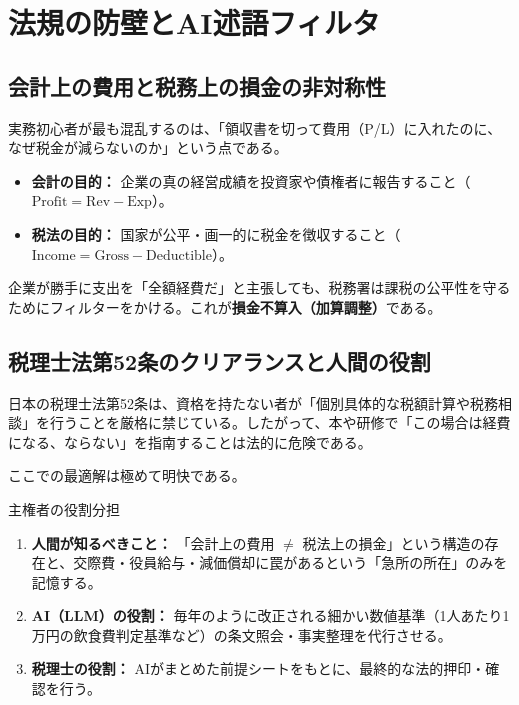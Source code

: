 \ifja
\chapter{法規の防壁とAI述語フィルタ}
\label{chap:tax_ai_filter}

\section{会計上の費用と税務上の損金の非対称性}
実務初心者が最も混乱するのは、「領収書を切って費用（P/L）に入れたのに、なぜ税金が減らないのか」という点である。
\begin{itemize}
    \item \textbf{会計の目的：} 企業の真の経営成績を投資家や債権者に報告すること（$\text{Profit} = \text{Rev} - \text{Exp}$）。
    \item \textbf{税法の目的：} 国家が公平・画一的に税金を徴収すること（$\text{Income} = \text{Gross} - \text{Deductible}$）。
\end{itemize}

企業が勝手に支出を「全額経費だ」と主張しても、税務署は課税の公平性を守るためにフィルターをかける。これが\textbf{損金不算入（加算調整）}である。



\section{税理士法第52条のクリアランスと人間の役割}
日本の税理士法第52条は、資格を持たない者が「個別具体的な税額計算や税務相談」を行うことを厳格に禁じている。したがって、本や研修で「この場合は経費になる、ならない」を指南することは法的に危険である。

ここでの最適解は極めて明快である。
\begin{rulebox}{主権者の役割分担}
\begin{enumerate}
    \item \textbf{人間が知るべきこと：} 「会計上の費用 $\neq$ 税法上の損金」という構造の存在と、交際費・役員給与・減価償却に罠があるという「急所の所在」のみを記憶する。
    \item \textbf{AI（LLM）の役割：} 毎年のように改正される細かい数値基準（1人あたり1万円の飲食費判定基準など）の条文照会・事実整理を代行させる。
    \item \textbf{税理士の役割：} AIがまとめた前提シートをもとに、最終的な法的押印・確認を行う。
\end{enumerate}
\end{rulebox}

